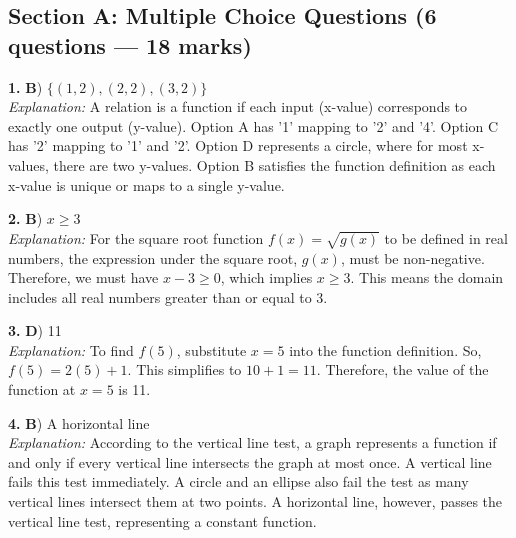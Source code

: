 \documentclass[12pt,a4paper]{article}
\begin{document}
\subsection*{Section A: Multiple Choice Questions \normalfont\small (6 questions --- 18 marks)}
\vspace{4pt}
\begin{answerbox}
\noindent\textbf{1.} \textbf{B}) $\{(1,2), (2,2), (3,2)\}$
\\ \noindent\textit{Explanation:} A relation is a function if each input (x-value) corresponds to exactly one output (y-value). Option A has '1' mapping to '2' and '4'. Option C has '2' mapping to '1' and '2'. Option D represents a circle, where for most x-values, there are two y-values. Option B satisfies the function definition as each x-value is unique or maps to a single y-value.
\end{answerbox}
\vspace{4pt}
\begin{answerbox}
\noindent\textbf{2.} \textbf{B}) $x \ge 3$
\\ \noindent\textit{Explanation:} For the square root function $f(x) = \sqrt{g(x)}$ to be defined in real numbers, the expression under the square root, $g(x)$, must be non-negative. Therefore, we must have $x-3 \ge 0$, which implies $x \ge 3$. This means the domain includes all real numbers greater than or equal to 3.
\end{answerbox}
\vspace{4pt}
\begin{answerbox}
\noindent\textbf{3.} \textbf{D}) 11
\\ \noindent\textit{Explanation:} To find $f(5)$, substitute $x=5$ into the function definition. So, $f(5) = 2(5) + 1$. This simplifies to $10 + 1 = 11$. Therefore, the value of the function at $x=5$ is 11.
\end{answerbox}
\vspace{4pt}
\begin{answerbox}
\noindent\textbf{4.} \textbf{B}) A horizontal line
\\ \noindent\textit{Explanation:} According to the vertical line test, a graph represents a function if and only if every vertical line intersects the graph at most once. A vertical line fails this test immediately. A circle and an ellipse also fail the test as many vertical lines intersect them at two points. A horizontal line, however, passes the vertical line test, representing a constant function.
\end{answerbox}
\vspace{4pt}
\end{document}
